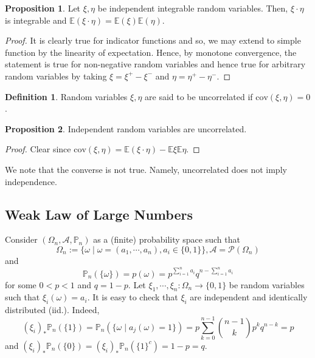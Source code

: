 \documentclass[]{article}
\theoremstyle{definition}
\theoremstyle{definition}
\newtheorem{definition}{Definition}[section]
\newtheorem{proposition}{Proposition}[section]
\begin{document}
\begin{proposition}
  Let \(\xi, \eta\) be independent integrable random variables. Then, \(\xi \cdot \eta\) 
  is integrable and \(\mathbb{E}(\xi \cdot \eta) = \mathbb{E}(\xi) \mathbb{E}(\eta)\).
\end{proposition}
\begin{proof}
  It is clearly true for indicator functions and so, we may extend to simple function 
  by the linearity of expectation. Hence, by monotone convergence, the statement is 
  true for non-negative random variables and hence true for arbitrary random variables 
  by taking \(\xi = \xi^+ - \xi^-\) and \(\eta = \eta^+ - \eta^-\).  
\end{proof}

\begin{definition}
  Random variables \(\xi, \eta\) are said to be uncorrelated if \(\text{cov}(\xi, \eta) = 0\).
\end{definition}

\begin{proposition}
  Independent random variables are uncorrelated.
\end{proposition}
\begin{proof}
  Clear since \(\text{cov}(\xi, \eta) = \mathbb{E}(\xi \cdot \eta) - \mathbb{E}\xi \mathbb{E}\eta\). 
\end{proof}

We note that the converse is not true. Namely, uncorrelated does not imply independence.

\subsection{Weak Law of Large Numbers}

Consider \((\Omega_n, \mathcal{A}, \mathbb{P}_n)\) as 
a (finite) probability space such that 
\[\Omega_n := \{\omega \mid \omega = (a_1, \cdots, a_n), a_i \in \{0, 1\}\},
  \mathcal{A} = \mathcal{P}(\Omega_n)\]
and 
\[\mathbb{P}_n(\{\omega\}) = p(\omega) = p^{\sum_{i = 1}^n a_i}q^{n - \sum_{i = 1}^n a_i}\]
for some \(0 < p < 1\) and \(q = 1 - p\). 
Let \(\xi_1, \cdots, \xi_n : \Omega_n \to \{0, 1\}\) be random variables such that 
\(\xi_i(\omega) = a_i\). It is easy to check that \(\xi_i\) are independent and 
identically distributed (iid.). Indeed, 
\[(\xi_i)_*\mathbb{P}_n(\{1\}) = \mathbb{P}_n(\{\omega \mid a_j(\omega) = 1\}) = 
  p\sum_{k = 0}^{n - 1} {{n - 1} \choose k} p^kq^{n - k} = p\]
and \((\xi_i)_*\mathbb{P}_n(\{0\}) = (\xi_i)_*\mathbb{P}_n(\{1\}^c) = 1 - p = q\). 
\end{document}
